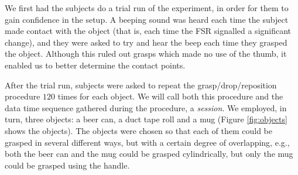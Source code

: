 We first had the subjects do a trial run of the experiment, in order
for them to gain confidence in the setup. A beeping sound was heard
each time the subject made contact with the object (that is, each time
the FSR signalled a significant change), and they were asked to try
and hear the beep each time they grasped the object. Although this
ruled out grasps which made no use of the thumb, it enabled us to
better determine the contact points.

After the trial run, subjects were asked to repeat the
grasp/drop/reposition procedure $120$ times for each object. We will
call both this procedure and the data time sequence gathered during
the procedure, a \emph{session}. We employed, in turn, three objects:
a beer can, a duct tape roll and a mug (Figure \ref{fig:objects}
shows the objects). The objects were chosen so that each of them could be
grasped in several different ways, but with a certain degree of
overlapping, e.g., both the beer can and the mug could be grasped
cylindrically, but only the mug could be grasped using the handle.

